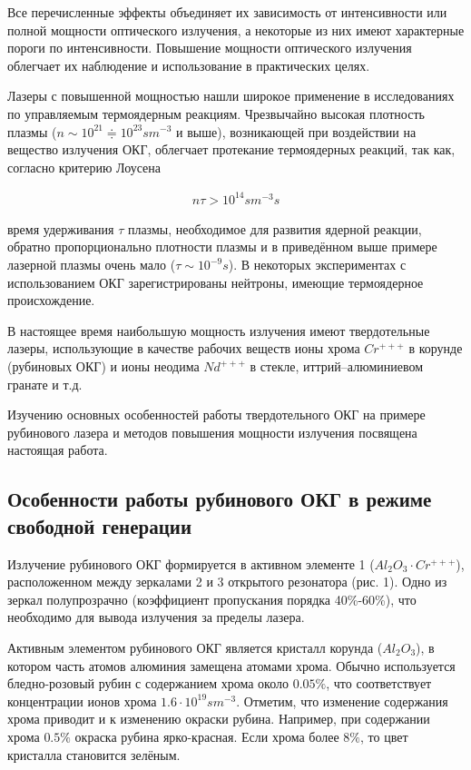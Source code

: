 \documentclass[a4paper,14pt,russian]{article}
\begin{document}
Все перечисленные эффекты объединяет их зависимость от интенсивности или полной мощности оптического излучения, а некоторые из них имеют характерные пороги по интенсивности. Повышение мощности оптического излучения облегчает их наблюдение и использование в практических целях.

Лазеры с повышенной мощностью нашли широкое применение в исследованиях по управляемым термоядерным реакциям. Чрезвычайно высокая плотность плазмы ($n \sim 10^{21} \Doteq 10^{23} sm^{-3}$ и выше), возникающей при воздействии на вещество излучения ОКГ, облегчает протекание термоядерных реакций, так как, согласно критерию Лоусена

\begin{eqnarray}
n \tau > 10^{14} sm^{-3} s
\end{eqnarray}

время удерживания $\tau$ плазмы, необходимое для развития ядерной реакции, обратно пропорционально плотности плазмы и в приведённом выше примере лазерной плазмы очень мало ($\tau \sim 10^{-9} s$). В некоторых экспериментах с использованием ОКГ зарегистрированы нейтроны, имеющие термоядерное происхождение.

В настоящее время наибольшую мощность излучения имеют твердотельные лазеры, использующие в качестве рабочих веществ ионы хрома $Cr^{+++}$ в корунде (рубиновых ОКГ) и ионы неодима $Nd^{+++}$ в стекле, иттрий--алюминиевом гранате и т.д.

Изучению основных особенностей работы твердотельного ОКГ на примере рубинового лазера и методов повышения мощности излучения посвящена настоящая работа.

\subsection {Особенности работы рубинового ОКГ в режиме свободной генерации}

Излучение рубинового ОКГ формируется в активном элементе 1 ($Al_2O_3 \cdot Cr^{+++}$), расположенном между зеркалами 2 и 3 открытого резонатора (рис. 1). Одно из зеркал полупрозрачно (коэффициент пропускания порядка 40\%-60\%), что необходимо для вывода излучения за пределы лазера.

Активным элементом рубинового ОКГ является кристалл корунда ($Al_2O_3$), в котором часть атомов алюминия замещена атомами хрома. Обычно используется бледно-розовый рубин с содержанием хрома около $0.05\%$, что соответствует концентрации ионов хрома $1.6 \cdot 10^{19} sm^{-3}$. Отметим, что изменение содержания хрома приводит и к изменению окраски рубина. Например, при содержании хрома $0.5\%$ окраска рубина ярко-красная. Если хрома более $8\%$, то цвет кристалла становится зелёным.
\end{document}
